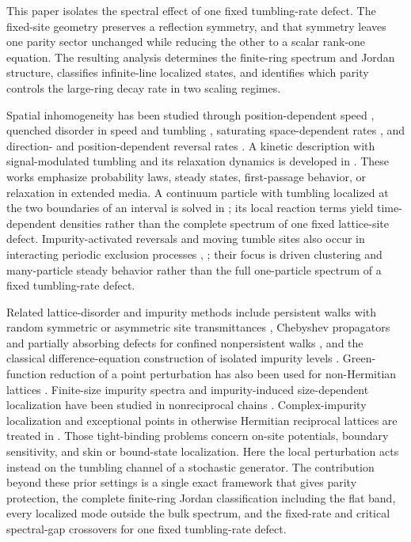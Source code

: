\documentclass[twoside,10pt]{article}
\numberwithin{equation}{section}
\theoremstyle{slbody}
\theoremstyle{definition}
\theoremstyle{remark}
\begin{document}
This paper isolates the spectral effect of one fixed tumbling-rate defect.
The fixed-site geometry preserves a reflection symmetry, and that symmetry
leaves one parity sector unchanged while reducing the other to a scalar
rank-one equation.  The resulting analysis determines the finite-ring
spectrum and Jordan structure, classifies infinite-line localized states,
and identifies which parity controls the large-ring decay rate in two
scaling regimes.

Spatial inhomogeneity has been studied through position-dependent speed
\cite{AngelaniGarra2019}, quenched disorder in speed and tumbling
\cite[Secs.~II.A.2--II.A.3 and II.B.2--II.B.3]
{BenDorWoillezKafriKardarSolon2019}, saturating space-dependent rates
\cite[Sec.~II, Eqs.~(3)--(4)]{JainChatterjee2024}, and direction- and
position-dependent reversal rates
\cite[Secs.~2--4]{SinghSabhapanditKundu2020}.  A kinetic description with
signal-modulated tumbling and its relaxation dynamics is developed in
\cite{VillaTorrealbaNaviaSoto2023}.  These works emphasize
probability laws, steady states, first-passage behavior, or relaxation in
extended media.  A continuum particle with tumbling localized at the two
boundaries of an interval is solved in
\cite[Sec.~III, Eqs.~(16) and (29)--(30)]{RobertsPruessner2022}; its local
reaction terms yield time-dependent densities rather than the complete
spectrum of one fixed lattice-site defect.  Impurity-activated reversals and
moving tumble sites
also occur in interacting periodic exclusion processes
\cite[Secs.~V--VII]{ChatterjeeHayakawa2023},
\cite[Secs.~II--IV]{DasChatterjee2025}; their focus is driven clustering
and many-particle steady behavior rather than the full one-particle
spectrum of a fixed tumbling-rate defect.

Related lattice-disorder and impurity methods include persistent walks with
random symmetric or asymmetric site transmittances
\cite{MiriSadjadiFouladvand2006,SadjadiMiri2008}, Chebyshev propagators and
partially absorbing defects for confined nonpersistent walks
\cite[Secs.~VI--VII and Apps.~C and E]{Giuggioli2020}, and the
classical difference-equation construction of isolated impurity levels
\cite{KosterSlater1954}.  Green-function reduction of a point
perturbation has also been used for non-Hermitian lattices
\cite[Secs.~II--III and Eqs.~(11)--(15)]{Roccati2021}.  Finite-size
impurity spectra and impurity-induced size-dependent localization have
been studied in nonreciprocal chains \cite{LiuZengLiChen2021}.
Complex-impurity localization and exceptional points in otherwise
Hermitian reciprocal lattices are treated in
\cite{KokkinakisKomisMakrisEconomou2026}.  Those tight-binding problems
concern on-site potentials, boundary sensitivity, and skin or bound-state
localization.  Here the local perturbation acts instead on the tumbling
channel of a stochastic generator.
The contribution beyond these prior settings is a single exact framework
that gives parity protection, the complete finite-ring Jordan classification
including the flat band, every localized mode outside the bulk spectrum, and
the fixed-rate and critical spectral-gap crossovers for one fixed
tumbling-rate defect.
\end{document}
